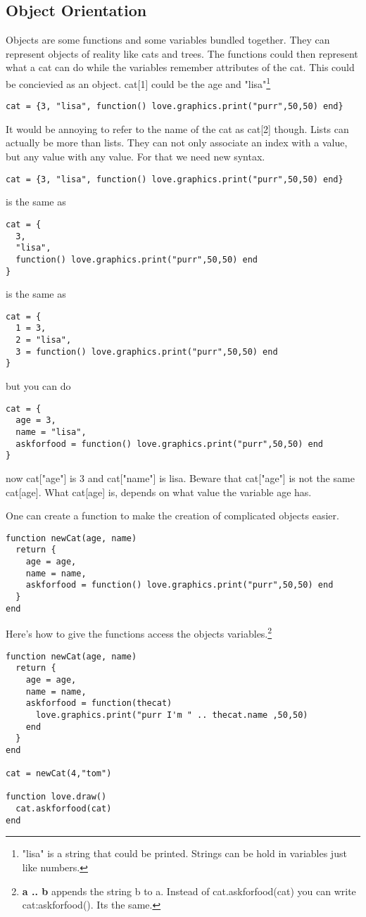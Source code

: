 \documentclass[a4paper, 11pt]{article}
\begin{document}
\subsection{Object Orientation}
Objects are some functions and some variables bundled together. They can represent objects of reality like cats and trees.
The functions could then represent what a cat can do while the variables remember attributes of the cat.
This could be concievied as an object. cat[1] could be the age and "lisa"\footnote{"lisa" is a string that could be printed. Strings can be hold in variables just like numbers.} 
\begin{lstlisting}
cat = {3, "lisa", function() love.graphics.print("purr",50,50) end}
\end{lstlisting}
It would be annoying to refer to the name of the cat as cat[2] though.
Lists can actually be more than lists. They can not only associate an index with a value, but any value with any value.
For that we need new syntax.
\begin{lstlisting}
cat = {3, "lisa", function() love.graphics.print("purr",50,50) end}
\end{lstlisting}
is the same as
\begin{lstlisting}
cat = {
  3,
  "lisa",
  function() love.graphics.print("purr",50,50) end
}
\end{lstlisting}
is the same as
\begin{lstlisting}
cat = {
  1 = 3,
  2 = "lisa",
  3 = function() love.graphics.print("purr",50,50) end
}
\end{lstlisting}
but you can do
\begin{lstlisting}
cat = {
  age = 3,
  name = "lisa",
  askforfood = function() love.graphics.print("purr",50,50) end
}
\end{lstlisting}
now cat["age"] is 3 and cat["name"] is lisa.
Beware that cat["age"] is not the same cat[age]. What cat[age] is, depends on what value the variable age has.

One can create a function to make the creation of complicated objects easier.

\begin{lstlisting}
function newCat(age, name)
  return {
    age = age,
    name = name,
    askforfood = function() love.graphics.print("purr",50,50) end
  }
end
\end{lstlisting}
Here's how to give the functions  access the objects variables.\footnote{\textbf{a .. b} appends the string b to a. Instead of cat.askforfood(cat) you can write cat:askforfood(). Its the same.}
\begin{lstlisting}
function newCat(age, name)
  return {
    age = age,
    name = name,
    askforfood = function(thecat)
      love.graphics.print("purr I'm " .. thecat.name ,50,50)
    end
  }
end

cat = newCat(4,"tom")

function love.draw()
  cat.askforfood(cat)
end
\end{lstlisting}

\fi


\end{document}
